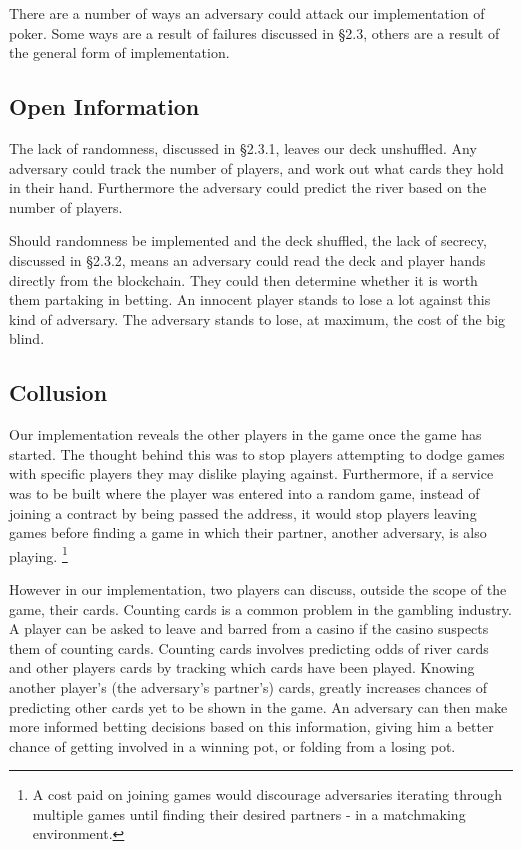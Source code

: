 There are a number of ways an adversary could attack our implementation of poker. Some ways are a result of failures discussed in §2.3, others are a result of the general form of implementation.

\subsection{Open Information}

The lack of randomness, discussed in §2.3.1, leaves our deck unshuffled. Any adversary could track the number of players, and work out what cards they hold in their hand. Furthermore the adversary could predict the river based on the number of players.

Should randomness be implemented and the deck shuffled, the lack of secrecy, discussed in §2.3.2, means an adversary could read the deck and player hands directly from the blockchain. They could then determine whether it is worth them partaking in betting. An innocent player stands to lose a lot against this kind of adversary. The adversary stands to lose, at maximum, the cost of the big blind.

\subsection{Collusion}

Our implementation reveals the other players in the game once the game has started. The thought behind this was to stop players attempting to dodge games with specific players they may dislike playing against. Furthermore, if a service was to be built where the player was entered into a random game, instead of joining a contract by being passed the address, it would stop players leaving games before finding a game in which their partner, another adversary, is also playing. \footnote{A cost paid on joining games would discourage adversaries iterating through multiple games until finding their desired partners - in a matchmaking environment.}

However in our implementation, two players can discuss, outside the scope of the game, their cards. Counting cards \cite{countingcards} is a common problem in the gambling industry. A player can be asked to leave and barred from a casino if the casino suspects them of counting cards. Counting cards involves predicting odds of river cards and other players cards by tracking which cards have been played. Knowing another player's (the adversary's partner's) cards, greatly increases chances of predicting other cards yet to be shown in the game. An adversary can then make more informed betting decisions based on this information, giving him a better chance of getting involved in a winning pot, or folding from a losing pot.

